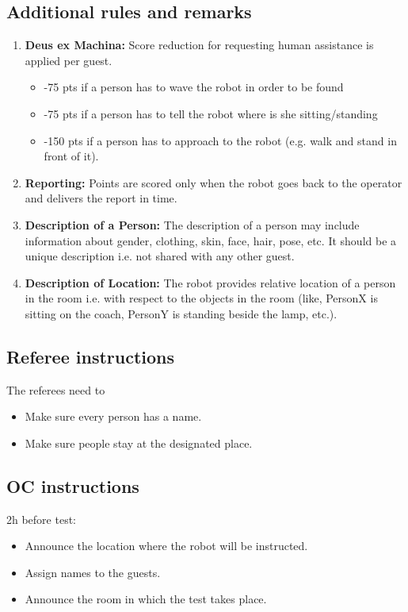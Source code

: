 \subsection{Additional rules and remarks}
\begin{enumerate}[nosep]
	\item \textbf{Deus ex Machina:} Score reduction for requesting human assistance is applied per guest.
	\begin{itemize}
		\item -75 pts if a person has to wave the robot in order to be found
		\item -75 pts if a person has to tell the robot where is she sitting/standing
		\item -150 pts if a person has to approach to the robot (e.g. walk and stand in front of it).
	\end{itemize}

	\item \textbf{Reporting:} Points are scored only when the robot goes back to the operator and delivers the report in time.
	
	\item \textbf{Description of a Person:} The description of a person may include information about gender, clothing, skin, face, hair, pose, etc. It should be a unique description i.e. not shared with any other guest.
	
	\item \textbf{Description of Location:} The robot provides relative location of a person in the room i.e. with respect to the objects in the room (like, PersonX is sitting on the coach, PersonY is standing beside the lamp, etc.). 
\end{enumerate}


\subsection{Referee instructions}

The referees need to
\begin{itemize}
	\item Make sure every person has a name.
	\item Make sure people stay at the designated place.
\end{itemize}

\subsection{OC instructions}

2h before test:
\begin{itemize}
	\item Announce the location where the robot will be instructed.
	\item Assign names to the guests.
	\item Announce the room in which the test takes place.
\end{itemize}

% 
